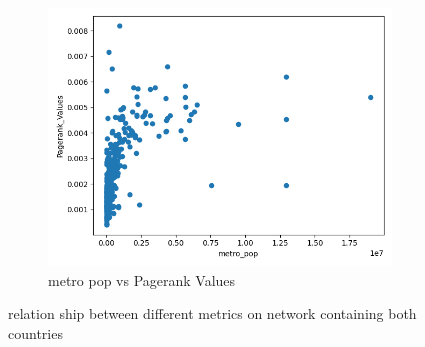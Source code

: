 \begin{figure}[H]
\begin{subfigure}[b]{0.3\textwidth}
     \end{subfigure}
     \hfill
     \begin{subfigure}[b]{0.3\textwidth}
         \centering
         \includegraphics[width=\textwidth]{images/comparison/ALL/relationship_metro_pop_vs_Pagerank_Values_ALL.png}
         \caption{metro pop vs Pagerank Values}
     \end{subfigure}
        \caption{relation ship between different metrics on network containing both countries}
        \label{fig:ALL5}
\end{figure}






